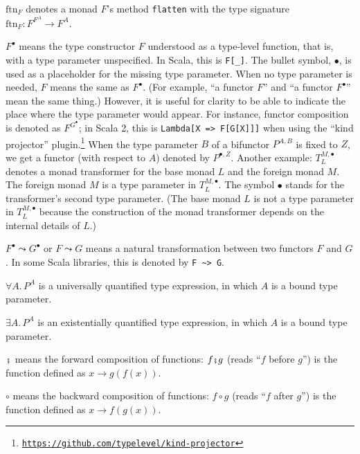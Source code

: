 $\text{ftn}_{F}$ denotes a monad $F$\textsf{'}s method \lstinline!flatten!
with the type signature $\text{ftn}_{F}:F^{F^{A}}\rightarrow F^{A}$.

$F^{\bullet}$ means the type constructor $F$ understood as a type-level
function, \textemdash{} that is, with a type parameter unspecified.
In Scala, this is \lstinline!F[_]!. The bullet symbol, $\bullet$,
is used as a placeholder for the missing type parameter. When no type
parameter is needed, $F$ means the same as $F^{\bullet}$. (For example,
\textsf{``}a functor $F$\textsf{''} and \textsf{``}a functor $F^{\bullet}$\textsf{''} mean the same
thing.) However, it is useful for clarity to be able to indicate the
place where the type parameter would appear. For instance, functor
composition is denoted as $F^{G^{\bullet}}$; in Scala 2, this is
\texttt{}\lstinline!Lambda[X => F[G[X]]]! when using the \textsf{``}kind
projector\textsf{''} plugin.\footnote{\texttt{\href{https://github.com/typelevel/kind-projector}{https://github.com/typelevel/kind-projector}}}
When the type parameter $B$ of a bifunctor $P^{A,B}$ is fixed to
$Z$, we get a functor (with respect to $A$) denoted by $P^{\bullet,Z}$.
Another example: $T_{L}^{M,\bullet}$ denotes a monad transformer
for the base monad $L$ and the foreign monad $M$. The foreign monad
$M$ is a type parameter in $T_{L}^{M,\bullet}$. The symbol $\bullet$
stands for the transformer\textsf{'}s second type parameter. (The base monad
$L$ is not a type parameter in $T_{L}^{M,\bullet}$ because the construction
of the monad transformer depends on the internal details of $L$.)

$F^{\bullet}\leadsto G^{\bullet}$ or $F\leadsto G$ means a natural
transformation between two functors $F$ and $G$. In some Scala libraries,
this is denoted by \lstinline!F ~> G!.

$\forall A.\,P^{A}$ is a universally quantified type expression,
in which $A$ is a bound type parameter.

$\exists A.\,P^{A}$ is an existentially quantified type expression,
in which $A$ is a bound type parameter.

$\bef$ means the forward composition
of functions: $f\bef g$ (reads \textsf{``}$f$ before $g$\textsf{''}) is the function
defined as $x\rightarrow g(f(x))$.

$\circ$ means the backward composition
of functions: $f\circ g$ (reads \textsf{``}$f$ after $g$\textsf{''}) is the function
defined as $x\rightarrow f(g(x))$.


